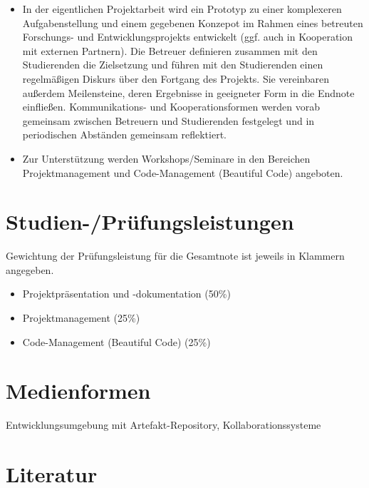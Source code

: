\begin{itemize}
\tightlist
\item
  In der eigentlichen Projektarbeit wird ein Prototyp zu einer
  komplexeren Aufgabenstellung und einem gegebenen Konzepot im Rahmen
  eines betreuten Forschungs- und Entwicklungsprojekts entwickelt (ggf.
  auch in Kooperation mit externen Partnern). Die Betreuer definieren
  zusammen mit den Studierenden die Zielsetzung und führen mit den
  Studierenden einen regelmäßigen Diskurs über den Fortgang des
  Projekts. Sie vereinbaren außerdem Meilensteine, deren Ergebnisse in
  geeigneter Form in die Endnote einfließen. Kommunikations- und
  Kooperationsformen werden vorab gemeinsam zwischen Betreuern und
  Studierenden festgelegt und in periodischen Abständen gemeinsam
  reflektiert.
\item
  Zur Unterstützung werden Workshops/Seminare in den Bereichen
  Projektmanagement und Code-Management (Beautiful Code) angeboten.
\end{itemize}

\section*{Studien-/Prüfungsleistungen\label{/mi-2017/modulbeschreibungen-master/MA_Modul_Projekt_Entwicklung}}\label{studien-pruxfcfungsleistungenpathlabelmi-2017modulbeschreibungen-mastermaux5fmodulux5fprojektux5fentwicklung}

Gewichtung der Prüfungsleistung für die Gesamtnote ist jeweils in
Klammern angegeben.

\begin{itemize}
\tightlist
\item
  Projektpräsentation und -dokumentation (50\%)
\item
  Projektmanagement (25\%)
\item
  Code-Management (Beautiful Code) (25\%)
\end{itemize}

\section*{Medienformen\label{/mi-2017/modulbeschreibungen-master/MA_Modul_Projekt_Entwicklung}}\label{medienformenpathlabelmi-2017modulbeschreibungen-mastermaux5fmodulux5fprojektux5fentwicklung}

Entwicklungsumgebung mit Artefakt-Repository, Kollaborationssysteme

\section*{Literatur\label{/mi-2017/modulbeschreibungen-master/MA_Modul_Projekt_Entwicklung}}\label{literaturpathlabelmi-2017modulbeschreibungen-mastermaux5fmodulux5fprojektux5fentwicklung}

